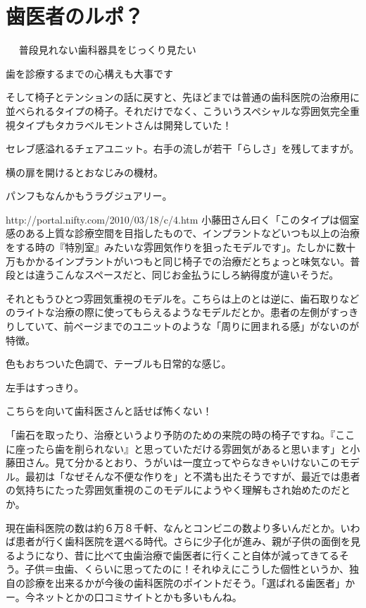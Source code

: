 \section{歯医者のルポ？}

	　 	
普段見れない歯科器具をじっくり見たい

歯を診療するまでの心構えも大事です

そして椅子とテンションの話に戻すと、先ほどまでは普通の歯科医院の治療用に並べられるタイプの椅子。それだけでなく、こういうスペシャルな雰囲気完全重視タイプもタカラベルモントさんは開発していた！


セレブ感溢れるチェアユニット。右手の流しが若干「らしさ」を残してますが。

横の扉を開けるとおなじみの機材。


パンフもなんかもうラグジュアリー。

http://portal.nifty.com/2010/03/18/c/4.htm
小藤田さん曰く「このタイプは個室感のある上質な診療空間を目指したもので、インプラントなどいつも以上の治療をする時の『特別室』みたいな雰囲気作りを狙ったモデルです」。たしかに数十万もかかるインプラントがいつもと同じ椅子での治療だとちょっと味気ない。普段とは違うこんなスペースだと、同じお金払うにしろ納得度が違いそうだ。

それともうひとつ雰囲気重視のモデルを。こちらは上のとは逆に、歯石取りなどのライトな治療の際に使ってもらえるようなモデルだとか。患者の左側がすっきりしていて、前ページまでのユニットのような「周りに囲まれる感」がないのが特徴。


色もおちついた色調で、テーブルも日常的な感じ。

左手はすっきり。


こちらを向いて歯科医さんと話せば怖くない！


「歯石を取ったり、治療というより予防のための来院の時の椅子ですね。『ここに座ったら歯を削られない』と思っていただける雰囲気があると思います」と小藤田さん。見て分かるとおり、うがいは一度立ってやらなきゃいけないこのモデル。最初は「なぜそんな不便な作りを」と不満も出たそうですが、最近では患者の気持ちにたった雰囲気重視のこのモデルにようやく理解もされ始めたのだとか。

現在歯科医院の数は約６万８千軒、なんとコンビニの数より多いんだとか。いわば患者が行く歯科医院を選べる時代。さらに少子化が進み、親が子供の面倒を見るようになり、昔に比べて虫歯治療で歯医者に行くこと自体が減ってきてるそう。子供＝虫歯、くらいに思ってたのに！それゆえにこうした個性というか、独自の診療を出来るかが今後の歯科医院のポイントだそう。「選ばれる歯医者」かー。今ネットとかの口コミサイトとかも多いもんね。

